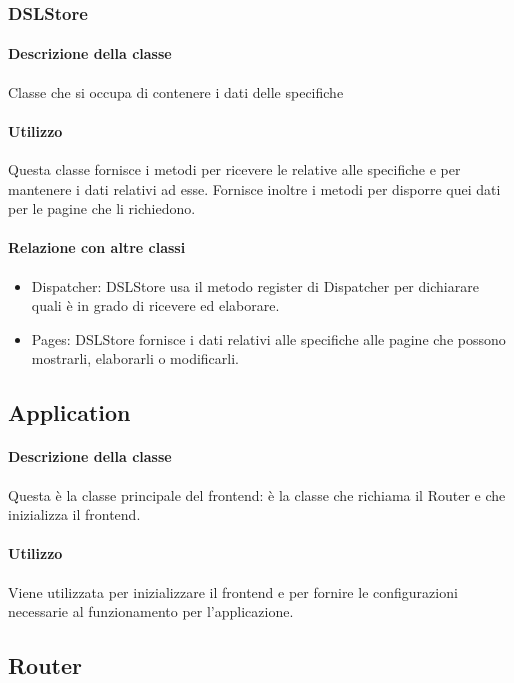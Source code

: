 \subsubsection{DSLStore}
\paragraph*{Descrizione della classe}
Classe che si occupa di contenere i dati delle specifiche 
\paragraph*{Utilizzo}
Questa classe fornisce i metodi per ricevere le  relative alle specifiche  e per mantenere i dati relativi ad esse. Fornisce inoltre i metodi per disporre quei dati per le pagine che li richiedono.
\paragraph*{Relazione con altre classi}
\begin{itemize}
\item Dispatcher: DSLStore usa il metodo register di Dispatcher per dichiarare quali  è in grado di ricevere ed elaborare.
\item Pages: DSLStore fornisce i dati relativi alle specifiche  alle pagine che possono mostrarli, elaborarli o modificarli.
\end{itemize}


\subsection{Application}
\paragraph*{Descrizione della classe}
Questa è la classe principale del frontend: è la classe che richiama il Router e che inizializza il frontend.
\paragraph*{Utilizzo}
Viene utilizzata per inizializzare il frontend e per fornire le configurazioni necessarie al funzionamento per l'applicazione.

\subsection{Router}
